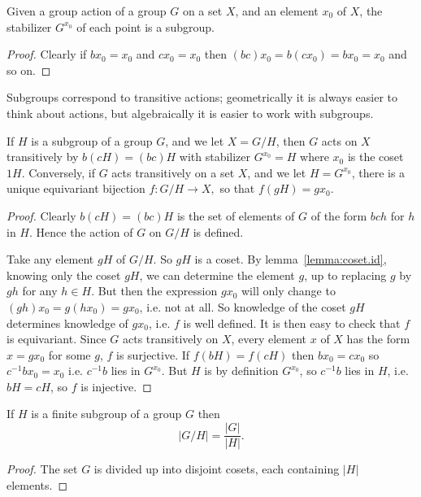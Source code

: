 \begin{lemma}
Given a group action of a group \(G\) on a set \(X\), and an element \(x_0\) of \(X\), the stabilizer \(G^{x_0}\) of each point is a subgroup.
\end{lemma}
\begin{proof}
Clearly if \(bx_0=x_0\) and \(cx_0=x_0\) then \((bc)x_0=b(cx_0)=bx_0=x_0\) and so on.
\end{proof}

Subgroups correspond to transitive actions; geometrically it is always easier to think about actions, but algebraically it is easier to work with subgroups.
\begin{theorem}
If \(H\) is a subgroup of a group \(G\), and we let \(X=G/H\), then \(G\) acts on \(X\) transitively by \(b(cH)=(bc)H\) with stabilizer \(G^{x_0}=H\) where \(x_0\) is the coset \(1H\).
Conversely, if \(G\) acts transitively on a set \(X\), and we let \(H=G^{x_0}\), there is a unique equivariant bijection
\(
f \colon G/H \to X,
\)
so that \(f(gH)=gx_0\).
\end{theorem}
\begin{proof}
Clearly \(b(cH)=(bc)H\) is the set of elements of \(G\) of the form \(bch\) for \(h\) in \(H\).
Hence the action of \(G\) on \(G/H\) is defined.

Take any element \(gH\) of \(G/H\).
So \(gH\) is a coset.
By lemma~\vref{lemma:coset.id}, knowing only the coset \(gH\), we can determine the element \(g\), up to replacing \(g\) by \(gh\) for any \(h \in H\).
But then the expression \(gx_0\) will only change to \((gh)x_0=g(hx_0)=gx_0\), i.e. not at all.
So knowledge of the coset \(gH\) determines knowledge of \(gx_0\), i.e. \(f\) is well defined.
It is then easy to check that \(f\) is equivariant.
Since \(G\) acts transitively on \(X\), every element \(x\) of \(X\) has the form \(x=gx_0\) for some \(g\), \(f\) is surjective.
If \(f(bH)=f(cH)\) then \(bx_0=cx_0\) so \(c^{-1}bx_0 = x_0\) i.e. \(c^{-1} b\) lies in \(G^{x_0}\).
But \(H\) is by definition \(G^{x_0}\), so \(c^{-1}b\) lies in \(H\), i.e. \(bH=cH\), so \(f\) is injective.
\end{proof}



\begin{theorem}[Lagrange]
If \(H\) is a finite subgroup of a group \(G\) then
\[
|G/H|=\frac{|G|}{|H|}.
\]
\end{theorem}
\begin{proof}
The set \(G\) is divided up into disjoint cosets, each containing \(|H|\) elements.
\end{proof}


